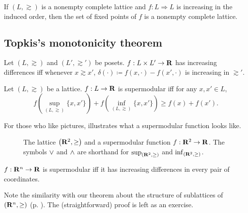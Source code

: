 \documentclass[11pt,letterpaper,reqno,oneside]{article}
\begin{document}
\begin{theorem}
	\label{theorem:Zhou}
	If $(L,\gtrsim)$ is a nonempty complete lattice and $f : L \Rightarrow L$ is increasing in the induced order, then the set of fixed points of $f$ is a nonempty complete lattice.
\end{theorem}



\subsection{Topkis's monotonicity theorem}
\label{sec:supermodular:supermodular_fns}

\begin{definition}
	Let $(L,\gtrsim)$ and $(L',\gtrsim')$ be posets. $f : L \times L' \to \mathbf{R}$ has increasing differences iff whenever $x \gtrsim x'$, $\delta(\cdot) \coloneqq f(x,\cdot)-f(x',\cdot)$ is increasing in $\gtrsim'$.
\end{definition}

\begin{definition}
	Let $(L,\gtrsim)$ be a lattice. $f : L \to \mathbf{R}$ is supermodular iff for any $x,x' \in L$,
	\begin{equation*}
		f\left( \sup_{(L,\gtrsim)}\{x,x'\} \right) 
		+ f\left( \inf_{(L,\gtrsim)}\{x,x'\} \right) 
		\geq f(x) + f(x') .
	\end{equation*}
\end{definition}

\noindent For those who like pictures,  illustrates what a supermodular function looks like.
%
\begin{figure}
	\centering
	
	\caption{The lattice $\left(\mathbf{R}^2,\geq\right)$ and a supermodular function $f : \mathbf{R}^2 \to \mathbf{R}$. The symbols $\vee$ and $\wedge$ are shorthand for $\sup_{(\mathbf{R}^2,\geq)}$ and $\inf_{(\mathbf{R}^2,\geq)}$.}
	\label{fig:example_supermodularity}
\end{figure}


\begin{proposition}
	$f : \mathbf{R}^n \to \mathbf{R}$ is supermodular iff it has increasing differences in every pair of coordinates.
\end{proposition}

Note the similarity with our theorem about the structure of sublattices of $\left(\mathbf{R}^n,\geq\right)$ (p. \pageref{theorem:sublattice_pairwise}). The (straightforward) proof is left as an exercise.
\end{document}
